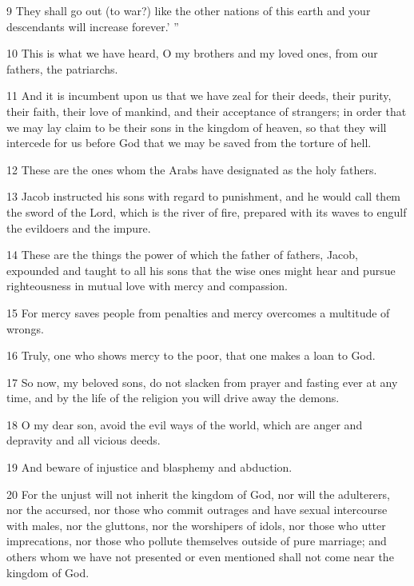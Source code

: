 \par 9 They shall go out (to war?) like the other nations of this earth and your descendants will increase forever.’ ”

\par 10 This is what we have heard, O my brothers and my loved ones, from our fathers, the patriarchs. 

\par 11 And it is incumbent upon us that we have zeal for their deeds, their purity, their faith, their love of mankind, and their acceptance of strangers; in order that we may lay claim to be their sons in the kingdom of heaven, so that they will intercede for us before God that we may be saved from the torture of hell. 

\par 12 These are the ones whom the Arabs have designated as the holy fathers. 

\par 13 Jacob instructed his sons with regard to punishment, and he would call them the sword of the Lord, which is the river of fire, prepared with its waves to engulf the evildoers and the impure. 

\par 14 These are the things the power of which the father of fathers, Jacob, expounded and taught to all his sons that the wise ones might hear and pursue righteousness in mutual love with mercy and compassion. 

\par 15 For mercy saves people from penalties and mercy overcomes a multitude of wrongs. 

\par 16 Truly, one who shows mercy to the poor, that one makes a loan to God. 

\par 17 So now, my beloved sons, do not slacken from prayer and fasting ever at any time, and by the life of the religion you will drive away the demons. 

\par 18 O my dear son, avoid the evil ways of the world, which are anger and depravity and all vicious deeds. 

\par 19 And beware of injustice and blasphemy and abduction. 

\par 20 For the unjust will not inherit the kingdom of God, nor will the adulterers, nor the accursed, nor those who commit outrages and have sexual intercourse with males, nor the gluttons, nor the worshipers of idols, nor those who utter imprecations, nor those who pollute themselves outside of pure marriage; and others whom we have not presented or even mentioned shall not come near the kingdom of God. 

